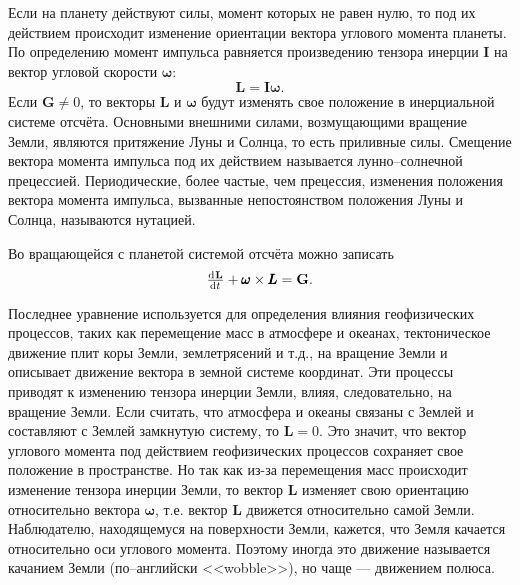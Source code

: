 \documentclass[11pt, a4paper,addpoints]{exam}
\theoremstyle{remark}
\begin{document}
    Если на планету действуют силы, момент которых не равен нулю, то под их действием происходит
    изменение ориентации вектора углового момента планеты. По определению момент импульса
    равняется произведению тензора инерции $\pmb{I}$ на вектор угловой скорости $\pmb{\omega}$:
    \begin{equation*}
        \mathbf{L} = \pmb{I}\pmb{\omega}.
    \end{equation*}
    Если $\pmb{G}\neq 0$, то векторы $\pmb{L}$ и $\pmb{\omega}$ будут изменять свое положение в
    инерциальной системе отсчёта. Основными внешними силами, возмущающими вращение Земли, являются
    притяжение Луны и Солнца, то есть приливные силы. Смещение вектора момента импульса под их
    действием называется лунно--солнечной прецессией. Периодические, более частые, чем прецессия, 
    изменения положения вектора момента импульса, вызванные непостоянством положения Луны и Солнца,
    называются нутацией.

    Во вращающейся с планетой системой отсчёта можно записать
    \begin{equation*}
        \od{\mathbf{L}}{t} + \pmb{\omega}\times\pmb{L} = \mathbf{G}.
    \end{equation*}

    Последнее уравнение используется для определения влияния геофизических процессов, таких как
    перемещение масс в атмосфере и океанах, тектоническое движение плит коры Земли, землетрясений и
    т.д., на вращение Земли и описывает движение вектора в земной системе координат. Эти процессы
    приводят к изменению тензора инерции Земли, влияя, следовательно, на вращение Земли. Если
    считать, что атмосфера и океаны связаны с Землей и составляют с Землей замкнутую систему, то
    $\pmb{L} = 0$. Это значит, что вектор углового момента под действием геофизических процессов сохраняет свое
    положение в пространстве. Но так как из-за перемещения масс происходит изменение тензора инерции
    Земли, то вектор $\pmb{L}$ изменяет свою ориентацию относительно вектора $\pmb{\omega}$, т.е.
    вектор $\pmb{L}$ движется относительно самой Земли. Наблюдателю, находящемуся на поверхности Земли, кажется, что Земля
    качается относительно оси углового момента. Поэтому иногда это движение называется качанием
    Земли (по--английски <<wobble>>), но чаще --- движением полюса\cite{Zharov2006}.
\end{document}
